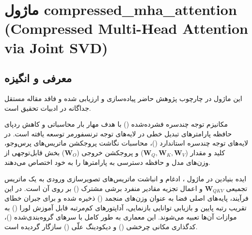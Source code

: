 \section{ماژول compressed\_mha\_attention (Compressed Multi-Head Attention via Joint SVD)}
\label{sec:module_compressed_mha_attention}

\subsection{معرفی و انگیزه}
این ماژول در چارچوب پژوهش حاضر پیاده‌سازی و ارزیابی شده و فاقد مقاله مستقل جداگانه در ادبیات تحقیق است.

مکانیزم توجه چندسره فشرده‌شده () با هدف مهار بار محاسباتی و کاهش ردپای حافظه پارامترهای تبدیل خطی در لایه‌های توجه ترنسفورمر توسعه یافته است. در لایه‌های توجه چندسره استاندارد ()، محاسبات نگاشت پروجکشن ماتریس‌های پرس‌وجو، کلید و مقدار ($\mathbf{W}_Q, \mathbf{W}_K, \mathbf{W}_V$) و پروجکشن خروجی ($\mathbf{W}_O$) بخش قابل‌توجهی از وزن‌های مدل و حافظه دسترسی به پارامترها را به خود اختصاص می‌دهند.

ایده بنیادین در ماژول ، ادغام و انباشت ماتریس‌های تصویرسازی ورودی به یک ماتریس تجمیعی $\mathbf{W}_{QKV}$ و اعمال تجزیه مقادیر منفرد برشی مشترک () بر روی آن است. در این فرآیند، پایه‌های اصلی فضا به عنوان وزن‌های منجمد () ذخیره شده و برای جبران خطای تقریب رتبه پایین و بازیابی توانایی بازنمایی، آداپتورهای کم‌مرتبه قابل آموزش لورا () به موازات آن‌ها تعبیه می‌شوند. این معماری به طور کامل با سرهای گروه‌بندی‌شده ()، کدگذاری مکانی چرخشی () و دیکودینگ علّی () سازگار گردیده است.


